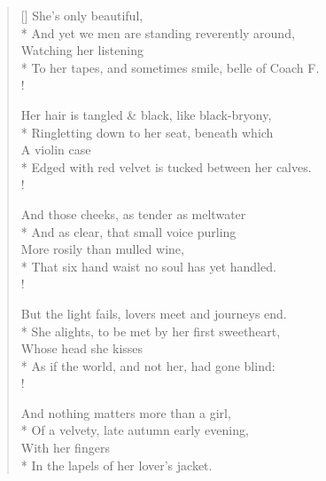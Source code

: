 \settowidth{\versewidth}{To her tapes, and sometimes smile, belle of Coach}
\begin{verse}[\versewidth]
She's only  beautiful,\\*
\vin And yet we men are standing reverently around,\\
\vin \vin Watching her listening\\*
\vin To her tapes, and sometimes smile, belle of Coach F.\\!

Her hair is tangled \& black, like black-bryony,\\*
\vin Ringletting down to her seat, beneath which\\
\vin \vin A violin case\\*
\vin Edged with red velvet is tucked between her calves.\\!

And those cheeks, as tender as meltwater\\*
\vin And as clear, that small voice purling\\
\vin \vin More rosily than mulled wine,\\*
\vin That six hand waist no soul has yet handled.\\!

But the light fails, lovers meet and journeys end.\\*
\vin She alights, to be met by her first sweetheart,\\
\vin \vin Whose head she kisses\\*
\vin As if the world, and not her, had gone blind:\\!

And nothing matters more than a girl,\\*
\vin Of a velvety, late autumn early evening,\\
\vin \vin With her fingers\\*
\vin In the lapels of her lover's jacket.
\end{verse}
